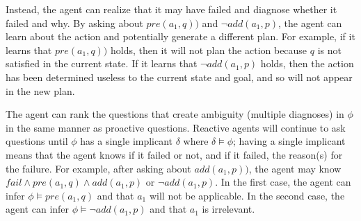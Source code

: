 \documentclass[letterpaper]{article}
\begin{document}
Instead, the agent can realize that it may have failed and diagnose whether it
failed and why.  By asking about $pre(a_1, q))$ and
$\neg add(a_1, p)$, the agent can learn about the action and potentially
generate a different plan.  For example, if it learns that $pre(a_1, q))$ holds,
then it will not plan the action because $q$ is not satisfied in the current
state.  If it learns that $\neg add(a_1, p)$ holds, then the action has been
determined useless to the current state and goal, and so will not appear in the
new plan.

The agent can rank the questions that create ambiguity (multiple diagnoses) in
$\phi$ in the same manner as proactive questions.  Reactive agents will continue
to ask questions until $\phi$ has a single implicant $\delta$ where $\delta
\models \phi$; having a single implicant means that the agent knows if it failed
or not, and if it failed, the reason(s) for the failure.  For example, after
asking about $add(a_1, p))$, the agent may know $fail \wedge pre(a_1, q) \wedge
add(a_1, p)$ or $\neg add(a_1, p)$.  In the first case, the agent can infer
$\phi \models pre(a_1, q)$ and that $a_1$ will not be applicable.  In the second
case, the agent can infer $\phi \models \neg add(a_1, p)$ and that $a_1$ is
irrelevant.


% 
\end{document}
